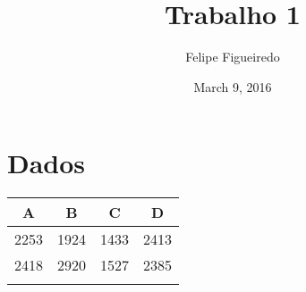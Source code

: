 \documentclass[]{article}
\title{Trabalho 1}
\author{Felipe Figueiredo}
\date{March 9, 2016}
\begin{document}
\maketitle


\section{Dados}\label{dados}

\begin{longtable}[c]{@{}cccc@{}}
\toprule
\begin{minipage}[b]{0.06\columnwidth}\centering\strut
A
\strut\end{minipage} &
\begin{minipage}[b]{0.06\columnwidth}\centering\strut
B
\strut\end{minipage} &
\begin{minipage}[b]{0.06\columnwidth}\centering\strut
C
\strut\end{minipage} &
\begin{minipage}[b]{0.06\columnwidth}\centering\strut
D
\strut\end{minipage}\tabularnewline
\midrule
\endhead
\begin{minipage}[t]{0.06\columnwidth}\centering\strut
2253
\strut\end{minipage} &
\begin{minipage}[t]{0.06\columnwidth}\centering\strut
1924
\strut\end{minipage} &
\begin{minipage}[t]{0.06\columnwidth}\centering\strut
1433
\strut\end{minipage} &
\begin{minipage}[t]{0.06\columnwidth}\centering\strut
2413
\strut\end{minipage}\tabularnewline
\begin{minipage}[t]{0.06\columnwidth}\centering\strut
2418
\strut\end{minipage} &
\begin{minipage}[t]{0.06\columnwidth}\centering\strut
2920
\strut\end{minipage} &
\begin{minipage}[t]{0.06\columnwidth}\centering\strut
1527
\strut\end{minipage} &
\begin{minipage}[t]{0.06\columnwidth}\centering\strut
2385
\strut\end{minipage}\tabularnewline
\begin{minipage}[t]{0.06\columnwidth}\centering\strut

\end{minipage}
\end{longtable}
\end{document}
